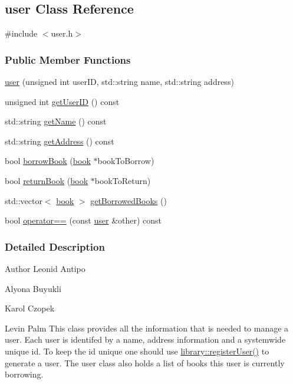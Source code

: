 \hypertarget{classuser}{\subsection{user Class Reference}
\label{classuser}
}


{\ttfamily \#include $<$user.\+h$>$}

\subsubsection*{Public Member Functions}
\begin{DoxyCompactItemize}
\item 
\hyperlink{classuser_aeaedee1afa1e244cd27028ee2e37ab4d}{user} (unsigned int user\+I\+D, std\+::string name, std\+::string address)
\item 
unsigned int \hyperlink{classuser_ad913a52f6e73e4e2fef4cdc28256f123}{get\+User\+I\+D} () const 
\item 
std\+::string \hyperlink{classuser_abdaf43e8172ce998e02f3b2d8c52ea3a}{get\+Name} () const 
\item 
std\+::string \hyperlink{classuser_af465b08f416163c5c04c80f5028670bc}{get\+Address} () const 
\item 
bool \hyperlink{classuser_ad62b7343f368a96742b9e48332ef91af}{borrow\+Book} (\hyperlink{classbook}{book} $\ast$book\+To\+Borrow)
\item 
bool \hyperlink{classuser_adb88e0898e2024231a9f2852893469ac}{return\+Book} (\hyperlink{classbook}{book} $\ast$book\+To\+Return)
\item 
std\+::vector$<$ \hyperlink{classbook}{book} $>$ \hyperlink{classuser_a9e436323a3549a846d342ba313b6bf0e}{get\+Borrowed\+Books} ()
\item 
bool \hyperlink{classuser_a340eedf07b7ff68a3fa4c77cd7511fc2}{operator==} (const \hyperlink{classuser}{user} \&other) const 
\end{DoxyCompactItemize}


\subsubsection{Detailed Description}
\begin{DoxyAuthor}{Author}
Leonid Antipo 

Alyona Buyukli 

Karol Czopek 

Levin Palm This class provides all the information that is needed to manage a user. Each user is identifed by a name, address information and a systemwide unique id. To keep the id unique one should use \hyperlink{classlibrary_aa6ec346e2b49ee2a78b1c8f5ebbf7f79}{library\+::register\+User()} to generate a user. The user class also holds a list of books this user is currently borrowing. 
\end{DoxyAuthor}


